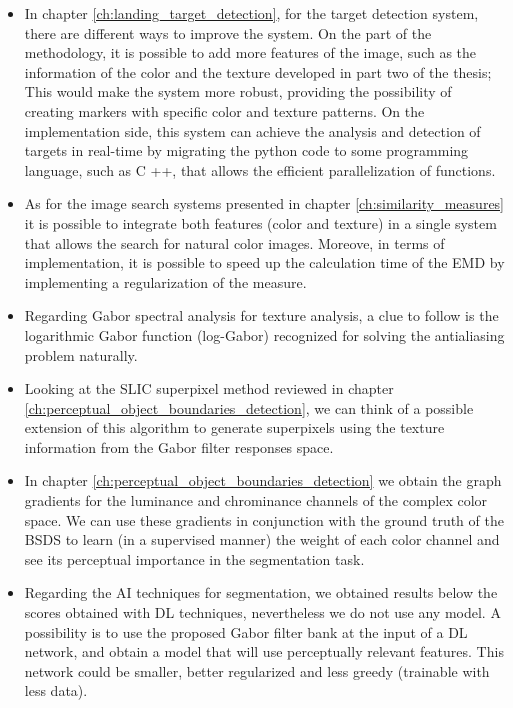 \begin{itemize}
	\item In chapter \ref{ch:landing_target_detection}, for the target detection system, there are different ways to improve the system. On the part of the methodology, it is possible to add more features of the image, such as the information of the color and the texture developed in part two of the thesis; This would make the system more robust, providing the possibility of creating markers with specific color and texture patterns. On the implementation side, this system can achieve the analysis and detection of targets in real-time by migrating the python code to some programming language, such as C ++, that allows the efficient parallelization of functions.
	
	 \item As for the image search systems presented in chapter \ref{ch:similarity_measures} it is possible to integrate both features (color and texture) in a single system that allows the search for natural color images. Moreove, in terms of implementation, it is possible to speed up the calculation time of the EMD by implementing a regularization of the measure.
	 
	 \item Regarding Gabor spectral analysis for texture analysis, a clue to follow is the logarithmic Gabor function (log-Gabor) recognized for solving the antialiasing problem naturally.
	 
	 \item Looking at the SLIC superpixel method reviewed in chapter \ref{ch:perceptual_object_boundaries_detection}, we can think of a possible extension of this algorithm to generate superpixels using the texture information from the Gabor filter responses space.
	 
	 \item In chapter \ref{ch:perceptual_object_boundaries_detection} we obtain the graph gradients for the luminance and chrominance channels of the complex color space. We can use these gradients in conjunction with the ground truth of the BSDS to learn (in a supervised manner) the weight of each color channel and see its perceptual importance in the segmentation task.
	 
	 \item Regarding the AI techniques for segmentation, we obtained results below the scores obtained with DL techniques, nevertheless we do not use any model. A possibility is to use the proposed Gabor filter bank at the input of a DL network, and obtain a model that will use perceptually relevant features. This network could be smaller, better regularized and less greedy (trainable with less data).
	 

\end{itemize}
